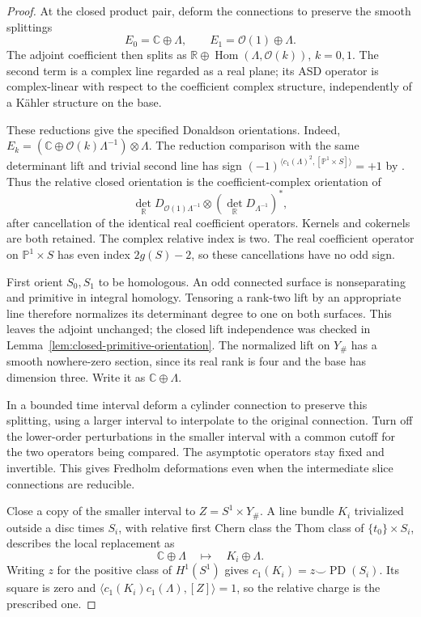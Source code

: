 \documentclass[11pt]{amsart}
\theoremstyle{definition}
\theoremstyle{remark}
\theoremstyle{plain}
\newcommand{\PP}{\mathbb{P}}
\begin{document}
\begin{proof}
At the closed product pair, deform the connections to
preserve the smooth splittings
\[
 E_0=\mathbb C\oplus\Lambda,\qquad
 E_1=\mathcal O(1)\oplus\Lambda.
\]
The adjoint coefficient then splits as
$\mathbb R\oplus\operatorname{Hom}(\Lambda,\mathcal O(k))$,
$k=0,1$. The second term is a complex line regarded
as a real plane; its ASD operator is complex-linear
with respect to the coefficient complex structure,
independently of a Kähler structure on the base.

These reductions give the specified Donaldson
orientations. Indeed,
$E_k=(\mathbb C\oplus\mathcal O(k)\Lambda^{-1})\otimes\Lambda$.
The reduction comparison with the same determinant lift
and trivial second line has sign
$(-1)^{\langle c_1(\Lambda)^2,[\PP^1\times S]\rangle}=+1$
by \cite[Proposition~3.25]{Donaldson87}.
Thus the relative closed orientation is the
coefficient-complex orientation of
\begin{equation}\label{eq:surface-reference-complex-line}
 \det_{\mathbb R}D_{\mathcal O(1)\Lambda^{-1}}
                      \otimes
                  (\det_{\mathbb R}D_{\Lambda^{-1}})^*,
\end{equation}
after cancellation of the identical real coefficient
operators. Kernels and cokernels are both retained.
The complex relative index is two. The real coefficient
operator on $\PP^1\times S$ has even index $2g(S)-2$,
so these cancellations have no odd sign.

First orient $S_0,S_1$ to be homologous. An odd connected
surface is nonseparating and primitive in integral homology.
Tensoring a rank-two lift by an appropriate line therefore
normalizes its determinant degree to one on both surfaces.
This leaves the adjoint unchanged; the closed lift
independence was checked in
Lemma~\ref{lem:closed-primitive-orientation}.
The normalized lift on $Y_\#$ has a smooth nowhere-zero
section, since its real rank is four and the base has
dimension three. Write it as $\mathbb C\oplus\Lambda$.

In a bounded time interval deform a cylinder connection
to preserve this splitting, using a larger interval
to interpolate to the original connection. Turn off
the lower-order perturbations in the smaller interval
with a common cutoff for the two operators being
compared. The asymptotic operators stay fixed and
invertible. This gives Fredholm deformations even
when the intermediate slice connections are reducible.

Close a copy of the smaller interval to
$Z=S^1\times Y_\#$. A line bundle $K_i$ trivialized
outside a disc times $S_i$, with relative first
Chern class the Thom class of $\{t_0\}\times S_i$,
describes the local replacement as
\[
             \mathbb C\oplus\Lambda
                         \quad\longmapsto\quad K_i\oplus\Lambda.
\]
Writing $z$ for the positive class of $H^1(S^1)$ gives
$c_1(K_i)=z\smile\operatorname{PD}(S_i)$.
Its square is zero and
$\langle c_1(K_i)c_1(\Lambda),[Z]\rangle=1$,
so the relative charge is the prescribed one.


\end{proof}
\end{document}
